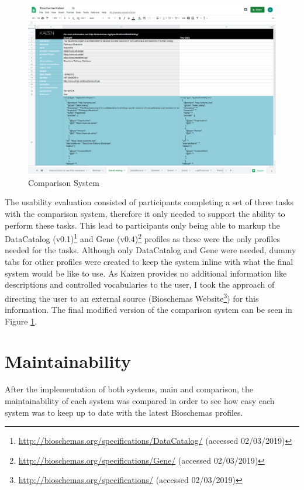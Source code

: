 \begin{figure}[!h]
 \centering\includegraphics[scale=0.13]{images/system/BioschemasKaizen.PNG}
   \caption{Comparison System}
   \label{fig:comparisonSystem}
\end{figure}


The usability evaluation consisted of participants completing a set of three tasks with the comparison system, therefore it only needed to support the ability to perform these tasks. This lead to participants only being able to markup the DataCatalog  (v0.1)\footnote{\url{http://bioschemas.org/specifications/DataCatalog/} (accessed 02/03/2019)} and Gene (v0.4)\footnote{\url{http://bioschemas.org/specifications/Gene/} (accessed 02/03/2019)} profiles as these were the only profiles needed for the tasks. Although only DataCatalog and Gene were needed, dummy tabs for other profiles were created to keep the system inline with what the final system would be like to use. As Kaizen provides no additional information like descriptions and controlled vocabularies to the user, I took the approach of directing the user to an external source (Bioschemas Website\footnote{\url{http://bioschemas.org/specifications/} (accessed 02/03/2019)}) for this information. The final modified version of the comparison system can be seen in Figure \ref{fig:comparisonSystem}. 
 

\newpage
\section{Maintainability}
After the implementation of both systems, main and comparison, the maintainability of each system was compared in order to see how easy each system was to keep up to date with the latest Bioschemas profiles.

